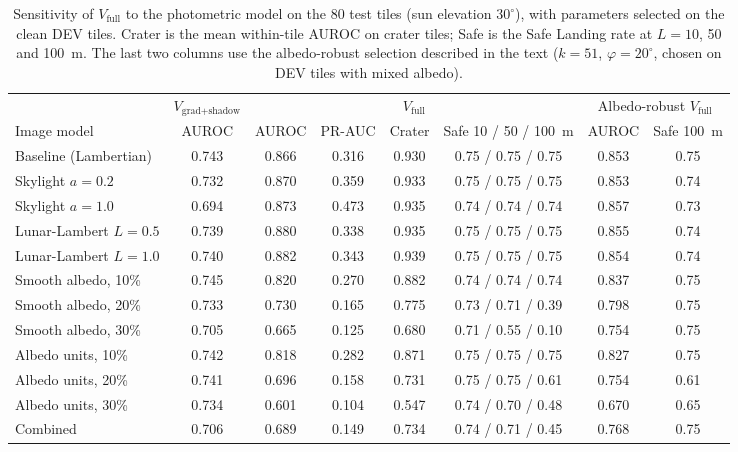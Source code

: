 \documentclass{article}
\begin{document}
\begin{table}[!htb]
  \caption{Sensitivity of $V_{\text{full}}$ to the photometric model on the 80 test tiles (sun elevation $30^\circ$), with parameters selected on the clean DEV tiles. Crater is the mean within-tile AUROC on crater tiles; Safe is the Safe Landing rate at $L = 10$, 50 and 100~m. The last two columns use the albedo-robust selection described in the text ($k = 51$, $\varphi = 20^\circ$, chosen on DEV tiles with mixed albedo).}
  \label{tab:photometry}
  \centering
  \small
  \setlength{\tabcolsep}{3pt}
  \begin{tabular}{lccccc cc}
    \toprule
    & $V_{\text{grad+shadow}}$ & \multicolumn{4}{c}{$V_{\text{full}}$} & \multicolumn{2}{c}{Albedo-robust $V_{\text{full}}$} \\
    \cmidrule(lr){2-2} \cmidrule(lr){3-6} \cmidrule(lr){7-8}
    Image model & AUROC & AUROC & PR-AUC & Crater & Safe 10 / 50 / 100~m & AUROC & Safe 100~m \\
    \midrule
    Baseline (Lambertian) & 0.743 & 0.866 & 0.316 & 0.930 & 0.75 / 0.75 / 0.75 & 0.853 & 0.75 \\
    Skylight $a = 0.2$ & 0.732 & 0.870 & 0.359 & 0.933 & 0.75 / 0.75 / 0.75 & 0.853 & 0.74 \\
    Skylight $a = 1.0$ & 0.694 & 0.873 & 0.473 & 0.935 & 0.74 / 0.74 / 0.74 & 0.857 & 0.73 \\
    Lunar-Lambert $L = 0.5$ & 0.739 & 0.880 & 0.338 & 0.935 & 0.75 / 0.75 / 0.75 & 0.855 & 0.74 \\
    Lunar-Lambert $L = 1.0$ & 0.740 & 0.882 & 0.343 & 0.939 & 0.75 / 0.75 / 0.75 & 0.854 & 0.74 \\
    Smooth albedo, 10\% & 0.745 & 0.820 & 0.270 & 0.882 & 0.74 / 0.74 / 0.74 & 0.837 & 0.75 \\
    Smooth albedo, 20\% & 0.733 & 0.730 & 0.165 & 0.775 & 0.73 / 0.71 / 0.39 & 0.798 & 0.75 \\
    Smooth albedo, 30\% & 0.705 & 0.665 & 0.125 & 0.680 & 0.71 / 0.55 / 0.10 & 0.754 & 0.75 \\
    Albedo units, 10\% & 0.742 & 0.818 & 0.282 & 0.871 & 0.75 / 0.75 / 0.75 & 0.827 & 0.75 \\
    Albedo units, 20\% & 0.741 & 0.696 & 0.158 & 0.731 & 0.75 / 0.75 / 0.61 & 0.754 & 0.61 \\
    Albedo units, 30\% & 0.734 & 0.601 & 0.104 & 0.547 & 0.74 / 0.70 / 0.48 & 0.670 & 0.65 \\
    Combined & 0.706 & 0.689 & 0.149 & 0.734 & 0.74 / 0.71 / 0.45 & 0.768 & 0.75 \\
    \bottomrule
  \end{tabular}
\end{table}
\end{document}

